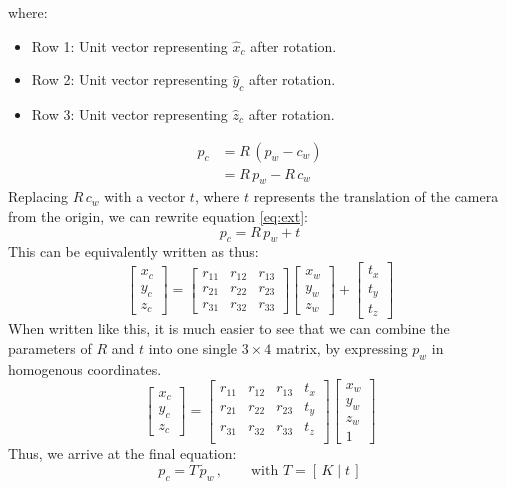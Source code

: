 \noindent where:
\begin{itemize}
    \item Row 1: Unit vector representing $\hat{x}_c$ after rotation.
    \item Row 2: Unit vector representing $\hat{y}_c$ after rotation.
    \item Row 3: Unit vector representing $\hat{z}_c$ after rotation.
\end{itemize}
\begin{align}
    p_c & = R\,(p_w-c_w) \nonumber        \\
        & = R\,p_w -R\,c_w \label{eq:ext}
\end{align}
Replacing $R\,c_w$ with a vector $t$, where $t$ represents the translation of the camera from the origin, we can rewrite equation \ref{eq:ext}:
\begin{equation}
    p_c = R\,p_w + t
\end{equation}
This can be equivalently written as thus:
\begin{equation*}
    \begin{bmatrix}
        x_c \\ y_c \\ z_c
    \end{bmatrix}
    =
    \begin{bmatrix}
        r_{11} & r_{12} & r_{13} \\
        r_{21} & r_{22} & r_{23} \\
        r_{31} & r_{32} & r_{33}
    \end{bmatrix}
    \begin{bmatrix}
        x_w \\ y_w \\ z_w
    \end{bmatrix}
    +
    \begin{bmatrix}
        t_x \\ t_y \\ t_z
    \end{bmatrix}
\end{equation*}
When written like this, it is much easier to see that we can combine the parameters of $R$ and $t$ into one single $3 \times 4$ matrix, by expressing $p_w$ in homogenous coordinates.
\begin{equation}
    \begin{bmatrix}
        x_c \\ y_c \\ z_c
    \end{bmatrix}
    =
    \begin{bmatrix}
        r_{11} & r_{12} & r_{13} & t_x \\
        r_{21} & r_{22} & r_{23} & t_y \\
        r_{31} & r_{32} & r_{33} & t_z \\
    \end{bmatrix}
    \begin{bmatrix}
        x_w \\ y_w \\ z_w \\ 1
    \end{bmatrix}
\end{equation}
Thus, we arrive at the final equation:
\begin{equation}
    p_c=T\,\widetilde{p}_w\,, \qquad \text{with } T=[\,K\;|\;t\,] \label{eq:pc}
\end{equation}

